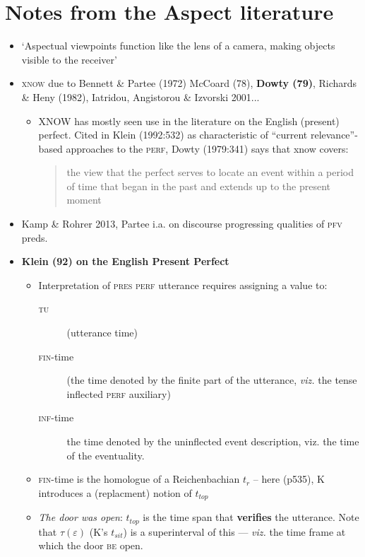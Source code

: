 \documentclass[10pt]{article}
\begin{document}
\part{Notes from the Aspect literature}
\begin{itemize}
\item `Aspectual viewpoints function like the lens of a camera, making objects visible to the receiver'
\item \textsc{xnow} due to Bennett \& Partee (1972) McCoard (78), \textbf{Dowty (79)}, Richards \& Heny (1982), Iatridou, Angistorou \& Izvorski 2001...
\begin{itemize}
	\item XNOW has mostly seen use in the literature on the English (present) perfect. Cited in Klein (1992:532) as characteristic of ``current relevance''-based approaches to the \textsc{perf}, Dowty (1979:341) says that xnow covers:
	\begin{quote}
		the view that the perfect serves to locate an event within a period of time that began in the past and extends up to the present moment
	\end{quote}
\end{itemize}
\item Kamp \& Rohrer 2013, Partee i.a. on discourse progressing qualities of \textsc{pfv} preds.
\item \textbf{Klein (92) on the English Present Perfect}
\begin{itemize}
	\item Interpretation of \textsc{pres perf} utterance requires assigning a value to:
	\begin{description}
		\item[\textsc{tu}] (utterance time)
		\item[\textsc{fin}-time] (the time denoted by the finite part of the utterance, \textit{viz.} the tense inflected \textsc{perf} auxiliary)
		\item[\textsc{inf-}time] the time denoted by the uninflected event description, viz. the time of the eventuality.
	\end{description}
\item \textsc{fin-}time is the homologue of a Reichenbachian $ t_r $ -- here (p535), K introduces a (replacment) notion of $ t_{top} $
\item \textit{The door was open}: $ t_{top} $ is the time span that \textbf{verifies} the utterance. Note that $ \tau(\varepsilon) $ (K's $ t_{sit} $) is a superinterval of this --- \textit{viz. }the time frame at which the door \textsc{be} open.

\end{itemize}
\end{itemize}
\end{document}

